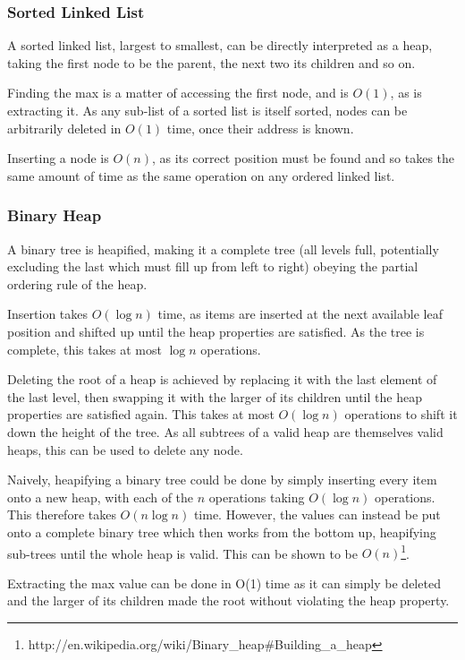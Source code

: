 \documentclass[]{article}
\begin{document}
\subsubsection{Sorted Linked List}

A sorted linked list, largest to smallest, can be directly interpreted as a heap, taking the first node to be the parent, the next two its children and so on.

Finding the max is a matter of accessing the first node, and is $O(1)$, as is extracting it. As any sub-list of a sorted list is itself sorted, nodes can be arbitrarily deleted in $O(1)$ time, once their address is known.

Inserting a node is $O(n)$, as its correct position must be found and so takes the same amount of time as the same operation on any ordered linked list.

\subsubsection{Binary Heap}

A binary tree is heapified, making it a complete tree (all levels full, potentially excluding the last which must fill up from left to right) obeying the partial ordering rule of the heap.

Insertion takes $O(\log{n})$ time, as items are inserted at the next available leaf position and shifted up until the heap properties are satisfied. As the tree is complete, this takes at most $\log{n}$ operations.

Deleting the root of a heap is achieved by replacing it with the last element of the last level, then swapping it with the larger of its children until the heap properties are satisfied again. This takes at most $O(\log{n})$ operations to shift it down the height of the tree. As all subtrees of a valid heap are themselves valid heaps, this can be used to delete any node.

Naively, heapifying a binary tree could be done by simply inserting every item onto a new heap, with each of the $n$ operations taking $O(\log{n})$ operations. This therefore takes $O(n\log{n})$ time. However, the values can instead be put onto a complete binary tree which then works from the bottom up, heapifying sub-trees until the whole heap is valid. This can be shown to be $O(n)$\footnote{http://en.wikipedia.org/wiki/Binary\_heap\#Building\_a\_heap}.

Extracting the max value can be done in O(1) time as it can simply be deleted and the larger of its children made the root without violating the heap property.
\end{document}
